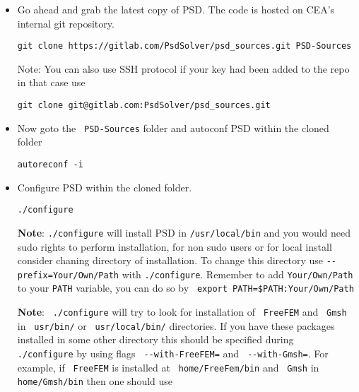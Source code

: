 \begin{itemize}
\item  Go ahead and grab the latest copy of PSD. The code is hosted on CEA's internal git repository.

\begin{lstlisting}[style=BashInputStyle]
git clone https://gitlab.com/PsdSolver/psd_sources.git PSD-Sources
\end{lstlisting}

Note: You can also use SSH protocol if your key had been added to the repo in that case use

\begin{lstlisting}[style=BashInputStyle]
git clone git@gitlab.com:PsdSolver/psd_sources.git
\end{lstlisting}

\item  Now goto the \lstinline[style=Linux]! PSD-Sources! folder and autoconf PSD within the  cloned folder

\begin{lstlisting}[style=BashInputStyle]
autoreconf -i
\end{lstlisting}

\item Configure  PSD within the  cloned folder.
\begin{lstlisting}[style=BashInputStyle]
./configure
\end{lstlisting}
\textbf{Note}:  \lstinline[style=Linux]!./configure! will install PSD in \lstinline[style=Linux]!/usr/local/bin! and you would need sudo rights to perform installation, for non sudo users or for local install consider chaning directory of installation. To change this directory use \lstinline[style=Linux]!--prefix=Your/Own/Path! with \lstinline[style=Linux]!./configure!. Remember to add \lstinline[style=Linux]!Your/Own/Path! to your  \lstinline[style=Linux]!PATH! variable, you can do so by \lstinline[style=Linux]! export PATH=$PATH:Your/Own/Path!

\textbf{Note}:   \lstinline[style=Linux]! ./configure! will try to look for installation of \lstinline[style=Linux]! FreeFEM! and \lstinline[style=Linux]! Gmsh! in \lstinline[style=Linux]! usr/bin/! or \lstinline[style=Linux]! usr/local/bin/! directories. If you have these packages installed in some other directory this should be specified during \lstinline[style=Linux]! ./configure! by using flags \lstinline[style=Linux]! --with-FreeFEM=! and \lstinline[style=Linux]! --with-Gmsh=!. For example, if \lstinline[style=Linux]! FreeFEM! is installed at \lstinline[style=Linux]! home/FreeFem/bin! and \lstinline[style=Linux]! Gmsh! in \lstinline[style=Linux]!home/Gmsh/bin! then one should use


\end{itemize}

